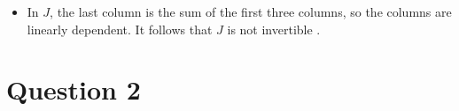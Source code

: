 \documentclass[a4paper]{article}
\begin{document}
\begin{solution}
\begin{itemize}
\begin{itemize}
\[         0&0&0&1 \\
         1/4&0&0&0 \\
         0&0&1/2&0
        \ebm
        = 
        \bbm
         1&0&0&0 \\
         0&1&0&0 \\
         0&0&1&0 \\
         0&0&0&1
        \ebm
     \]
     which shows that 
     \[ H^{-1} = 
        \bbm 
         0&1/3&0&0 \\
         0&0&0&1 \\
         1/4&0&0&0 \\
         0&0&1/2&0
        \ebm \mks{2}
     \]
    \item In $J$, the last column is the sum of the first three
     columns, so the columns are linearly dependent.  It follows that
     $J$ is not invertible .
   \end{itemize}
 \end{itemize}
\end{solution}


\section{Question 2}
\setcounter{probcounter}{0}
\end{document}
